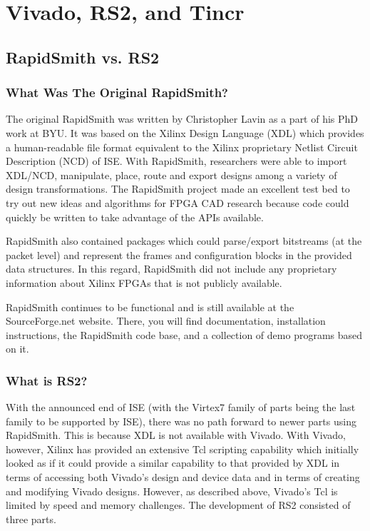 \newpage
\section{Vivado, RS2, and Tincr}
\subsection{RapidSmith vs. RS2}
\subsubsection{What Was The Original RapidSmith?}
The original RapidSmith was written by Christopher Lavin as a part of his PhD
work at BYU.  It was based on the Xilinx Design Language (XDL) which provides a
human-readable file format equivalent to the Xilinx proprietary Netlist Circuit
Description (NCD) of ISE.  With RapidSmith, researchers were able to import
XDL/NCD, manipulate, place, route and export designs among a variety of design
transformations.  The RapidSmith project made an excellent test bed to try out
new ideas and algorithms for FPGA CAD research because code could quickly be
written to take advantage of the APIs available.

RapidSmith also contained packages which could parse/export bitstreams (at the
packet level) and represent the frames and configuration blocks in the provided
data structures.  In this regard, RapidSmith did not include any proprietary
information about Xilinx FPGAs that is not publicly available.

RapidSmith continues to be functional and is still available at the
SourceForge.net website.  There, you will find documentation, installation
instructions, the RapidSmith code base, and a collection of demo programs based
on it.

\subsubsection{What is RS2?}
With the announced end of ISE (with the Virtex7 family of parts being the last
family to be supported by ISE), there was no path forward to newer parts using
RapidSmith.  This is because XDL is not available with Vivado. With
Vivado, however, Xilinx has provided an extensive Tcl scripting capability which 
initially looked as if it could provide a similar capability to that provided by
XDL in terms of accessing both Vivado's design and device data and in terms of
creating and modifying Vivado designs.  However, as described above, Vivado's
Tcl is limited by speed and memory challenges.
The development of RS2 consisted of three parts.

